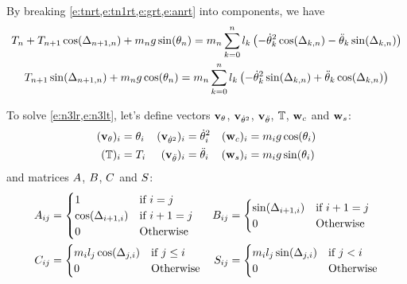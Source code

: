 \documentclass{article}
\begin{document}
By breaking \cref{e:tnrt,e:tn1rt,e:grt,e:anrt} into components, we have
\begin{gather}
  T_{n}+T_{n+1}\cos(\Delta_{n+1,n})+m_ng\sin(\theta_{n})
  =
  m_n\sum_{k=0}^n l_k \left(-\dot{\theta}_{k}^2\cos(\Delta_{k,n})-\ddot{\theta}_{k}\sin(\Delta_{k,n})\right)
  \label{e:n3lr}
  \\
  T_{n+1}\sin(\Delta_{n+1,n})+m_ng\cos(\theta_{n})
  =
  m_n\sum_{k=0}^{n}l_k \left(-\dot{\theta}_{k}^2\sin(\Delta_{k,n})+\ddot{\theta}_{k}\cos(\Delta_{k,n})\right)
  \label{e:n3lt}
\end{gather}

To solve \cref{e:n3lr,e:n3lt}, let's define vectors $\mathbf{v}_{\theta}$, $\mathbf{v}_{\dot\theta^2}$, $\mathbf{v}_{\ddot\theta}$, $\mathbb{T}$, $\mathbf{w}_c$ and $\mathbf{w}_s$:
\begin{subequations}
\begin{align}
  (\mathbf{v}_{\theta})_{i} &= \theta_{i}
  &
  (\mathbf{v}_{{\dot\theta^2}})_{i} &= \dot{\theta}_{i}^2
  &
  {(\mathbf{w}_c})_{i} &= m_ig\cos(\theta_i)
  \\
  (\mathbb{T})_{i} &= T_{i}
  &
  (\mathbf{v}_{{\ddot\theta}})_{i} &= \ddot{\theta}_{i}
  &
  {(\mathbf{w}_s})_{i} &= m_ig\sin(\theta_i)
\end{align}
\label{d:vecs}
\end{subequations}
and matrices $A$, $B$, $C$ and $S$:
\begin{subequations}
\begin{align}
  A_{ij}&= 
    \begin{cases}
      1 & \text{if }i=j\\
      \cos(\Delta_{i+1,i}) &  \text{if }i+1=j\\
      0 & \text{Otherwise}
    \end{cases}
  & 
  B_{ij}&=
  \begin{cases}
    \sin(\Delta_{i+1,i}) &  \text{if }i+1=j\\
    0 & \text{Otherwise}
  \end{cases}
  \\
  C_{ij}&= 
  \begin{cases}
    m_il_j\cos(\Delta_{j,i}) &  \text{if }j\le i\\
    0 & \text{Otherwise}
  \end{cases}
& 
  S_{ij}&= 
  \begin{cases}
    m_il_j\sin(\Delta_{j,i}) &  \text{if }j< i\\
    0 & \text{Otherwise}
  \end{cases}
\end{align}
\label{d:mats}
\end{subequations}
\end{document}
